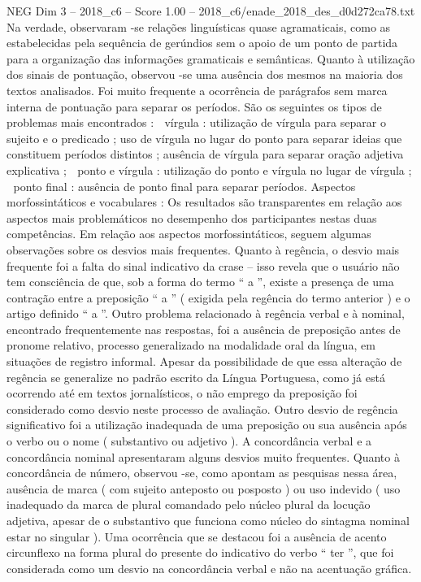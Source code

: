 \begin{textsample}{NEG Dim 3 – 2018\_c6 – Score 1.00 – 2018\_c6/enade\_2018\_des\_d0d272ca78.txt}
Na verdade, observaram -se relações linguísticas quase agramaticais, como as estabelecidas pela sequência de gerúndios sem o apoio de um ponto de partida para a organização das informações gramaticais e semânticas.
Quanto à utilização dos sinais de pontuação, observou -se uma ausência dos mesmos na maioria dos textos analisados.
Foi muito frequente a ocorrência de parágrafos sem marca interna de pontuação para separar os períodos.
São os seguintes os tipos de problemas mais encontrados :  vírgula : utilização de vírgula para separar o sujeito e o predicado ; uso de vírgula no lugar do ponto para separar ideias que constituem períodos distintos ; ausência de vírgula para separar oração adjetiva explicativa ;  ponto e vírgula : utilização do ponto e vírgula no lugar de vírgula ;  ponto final : ausência de ponto final para separar períodos.
Aspectos morfossintáticos e vocabulares : Os resultados são transparentes em relação aos aspectos mais problemáticos no desempenho dos participantes nestas duas competências.
Em relação aos aspectos morfossintáticos, seguem algumas observações sobre os desvios mais frequentes.
Quanto à regência, o desvio mais frequente foi a falta do sinal indicativo da crase – isso revela que o usuário não tem consciência de que, sob a forma do termo “ a ”, existe a presença de uma contração entre a preposição “ a ” ( exigida pela regência do termo anterior ) e o artigo definido “ a ”.
Outro problema relacionado à regência verbal e à nominal, encontrado frequentemente nas respostas, foi a ausência de preposição antes de pronome relativo, processo generalizado na modalidade oral da língua, em situações de registro informal.
Apesar da possibilidade de que essa alteração de regência se generalize no padrão escrito da Língua Portuguesa, como já está ocorrendo até em textos jornalísticos, o não emprego da preposição foi considerado como desvio neste processo de avaliação.
Outro desvio de regência significativo foi a utilização inadequada de uma preposição ou sua ausência após o verbo ou o nome ( substantivo ou adjetivo ).
A concordância verbal e a concordância nominal apresentaram alguns desvios muito frequentes.
Quanto à concordância de número, observou -se, como apontam as pesquisas nessa área, ausência de marca ( com sujeito anteposto ou posposto ) ou uso indevido ( uso inadequado da marca de plural comandado pelo núcleo plural da locução adjetiva, apesar de o substantivo que funciona como núcleo do sintagma nominal estar no singular ).
Uma ocorrência que se destacou foi a ausência de acento circunflexo na forma plural do presente do indicativo do verbo “ ter ”, que foi considerada como um desvio na concordância verbal e não na acentuação gráfica.

\end{textsample}
